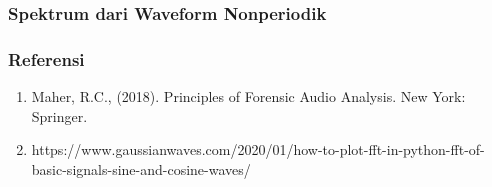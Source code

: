 \documentclass[pdflatex,compress]{beamer}
\begin{document}
\begin{frame}
	\frametitle{Spektrum dari Waveform Nonperiodik}
	\begin{multicols}{2}
		
		\columnbreak
	\end{multicols}
\end{frame}

\begin{frame}
	\frametitle{Referensi}
	\begin{enumerate}
		\item Maher, R.C., (2018). Principles of Forensic Audio Analysis. New York: Springer.
		\item https://www.gaussianwaves.com/2020/01/how-to-plot-fft-in-python-fft-of-basic-signals-sine-and-cosine-waves/
	\end{enumerate}
\end{frame}
\end{document}
